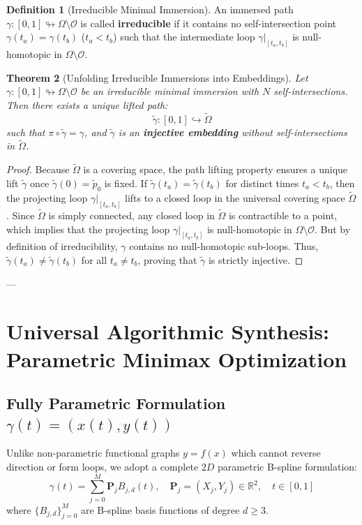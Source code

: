 \documentclass[11pt,reqno]{amsart}
\newtheorem{theorem}{Theorem}[section]
\theoremstyle{definition}
\newtheorem{definition}[theorem]{Definition}
\providecommand{\R}{\mathbb{R}}
\newcommand{\Cover}{\widetilde{\Omega}}
\numberwithin{equation}{section}
\providecommand{\R}{\mathbb{R}}
\begin{document}
\begin{definition}[Irreducible Minimal Immersion]
An immersed path $\gamma: [0, 1] \looparrowright \Omega \setminus \mathcal{O}$ is called \textbf{irreducible} if it contains no self-intersection point $\gamma(t_a) = \gamma(t_b)$ ($t_a < t_b$) such that the intermediate loop $\gamma|_{[t_a, t_b]}$ is null-homotopic in $\Omega \setminus \mathcal{O}$.
\end{definition}

\begin{theorem}[Unfolding Irreducible Immersions into Embeddings]
\label{thm:unfolding}
Let $\gamma: [0, 1] \looparrowright \Omega \setminus \mathcal{O}$ be an irreducible minimal immersion with $N$ self-intersections.
Then there exists a unique lifted path:
\begin{equation}
\tilde{\gamma}: [0, 1] \hookrightarrow \Cover
\end{equation}
such that $\pi \circ \tilde{\gamma} = \gamma$, and $\tilde{\gamma}$ is an \textbf{injective embedding} without self-intersections in $\Cover$.
\end{theorem}

\begin{proof}
Because $\Cover$ is a covering space, the path lifting property ensures a unique lift $\tilde{\gamma}$ once $\tilde{\gamma}(0) = \tilde{p}_0$ is fixed. If $\tilde{\gamma}(t_a) = \tilde{\gamma}(t_b)$ for distinct times $t_a < t_b$, then the projecting loop $\gamma|_{[t_a, t_b]}$ lifts to a closed loop in the universal covering space $\Cover$. Since $\Cover$ is simply connected, any closed loop in $\Cover$ is contractible to a point, which implies that the projecting loop $\gamma|_{[t_a, t_b]}$ is null-homotopic in $\Omega \setminus \mathcal{O}$. But by definition of irreducibility, $\gamma$ contains no null-homotopic sub-loops. Thus, $\tilde{\gamma}(t_a) \neq \tilde{\gamma}(t_b)$ for all $t_a \ne t_b$, proving that $\tilde{\gamma}$ is strictly injective.
\end{proof}

---

\section{Universal Algorithmic Synthesis: Parametric Minimax Optimization}

\subsection{Fully Parametric Formulation \texorpdfstring{$\gamma(t) = (x(t), y(t))$}{gamma(t) = (x(t), y(t))}}
Unlike non-parametric functional graphs $y = f(x)$ which cannot reverse direction or form loops, we adopt a complete $2D$ parametric B-spline formulation:
\begin{equation}
\gamma(t) = \sum_{j=0}^{M} \mathbf{P}_j B_{j, d}(t), \quad \mathbf{P}_j = (X_j, Y_j) \in \R^2, \quad t \in [0, 1]
\end{equation}
where $\{B_{j, d}\}_{j=0}^M$ are B-spline basis functions of degree $d \ge 3$.
\end{document}
